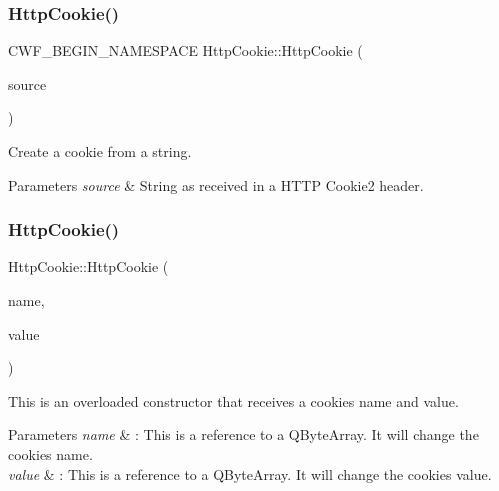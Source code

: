 \subsubsection{\texorpdfstring{Http\+Cookie()}{HttpCookie()}\hspace{0.1cm}{\footnotesize\ttfamily [1/2]}}
{\footnotesize\ttfamily C\+W\+F\+\_\+\+B\+E\+G\+I\+N\+\_\+\+N\+A\+M\+E\+S\+P\+A\+CE Http\+Cookie\+::\+Http\+Cookie (\begin{DoxyParamCaption}\item[{const Q\+Byte\+Array \&}]{source }\end{DoxyParamCaption})\hspace{0.3cm}{\ttfamily [explicit]}}

Create a cookie from a string. 
\begin{DoxyParams}{Parameters}
{\em source} & String as received in a H\+T\+TP Cookie2 header. \\
\hline
\end{DoxyParams}
\mbox{\label{class_http_cookie_a2037d1e3f9a6f65f0f3575df1cfcc200}} 
\subsubsection{\texorpdfstring{Http\+Cookie()}{HttpCookie()}\hspace{0.1cm}{\footnotesize\ttfamily [2/2]}}
{\footnotesize\ttfamily Http\+Cookie\+::\+Http\+Cookie (\begin{DoxyParamCaption}\item[{const Q\+Byte\+Array \&}]{name,  }\item[{const Q\+Byte\+Array \&}]{value }\end{DoxyParamCaption})}



This is an overloaded constructor that receives a cookie\textquotesingle{}s name and value. 


\begin{DoxyParams}{Parameters}
{\em name} & \+: This is a reference to a Q\+Byte\+Array. It will change the cookie\textquotesingle{}s name. \\
\hline
{\em value} & \+: This is a reference to a Q\+Byte\+Array. It will change the cookie\textquotesingle{}s value. \\
\hline
\end{DoxyParams}


